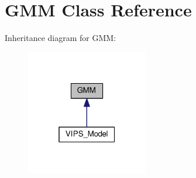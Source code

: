 \hypertarget{classGMM}{}\section{G\+MM Class Reference}
\label{classGMM}


Inheritance diagram for G\+MM\+:
\nopagebreak
\begin{figure}[H]
\begin{center}
\leavevmode
\includegraphics[width=151pt]{classGMM__inherit__graph}
\end{center}
\end{figure}
